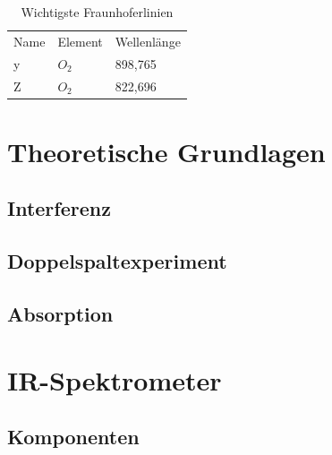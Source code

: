 \documentclass{article}
\begin{document}
\begin{table}[H]
    \centering
    \label{tab:wichtige-fraunhoferlinien}
    \begin{tabular}{l|l|l}
        Name & Element & Wellenlänge \\
        y    & $O_2$    & 898,765    \\
        Z    & $O_2$    & 822,696   
    \end{tabular}
    \caption{Wichtigste Fraunhoferlinien}
\end{table}







\section{Theoretische Grundlagen}


\subsection{Interferenz}


\subsection{Doppelspaltexperiment}


\subsection{Absorption}


\section{IR-Spektrometer}


\subsection{Komponenten}
\end{document}
